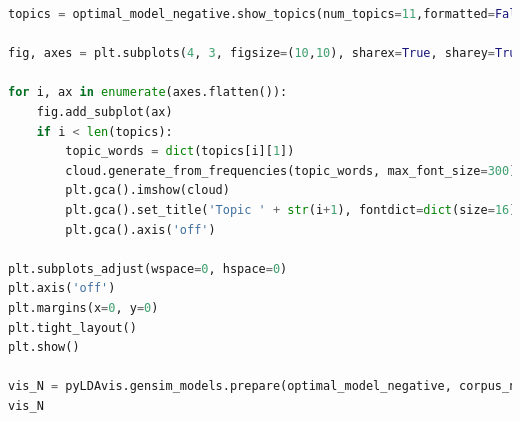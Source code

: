\documentclass[12pt]{article}
\begin{document}
\begin{lstlisting}[language = Python]
topics = optimal_model_negative.show_topics(num_topics=11,formatted=False)

fig, axes = plt.subplots(4, 3, figsize=(10,10), sharex=True, sharey=True)

for i, ax in enumerate(axes.flatten()):
    fig.add_subplot(ax)
    if i < len(topics):
        topic_words = dict(topics[i][1])
        cloud.generate_from_frequencies(topic_words, max_font_size=300)
        plt.gca().imshow(cloud)
        plt.gca().set_title('Topic ' + str(i+1), fontdict=dict(size=16))
        plt.gca().axis('off')

plt.subplots_adjust(wspace=0, hspace=0)
plt.axis('off')
plt.margins(x=0, y=0)
plt.tight_layout()
plt.show()

vis_N = pyLDAvis.gensim_models.prepare(optimal_model_negative, corpus_negative, id2word_N)
vis_N
\end{lstlisting}

\nocite{*}
\end{document}
